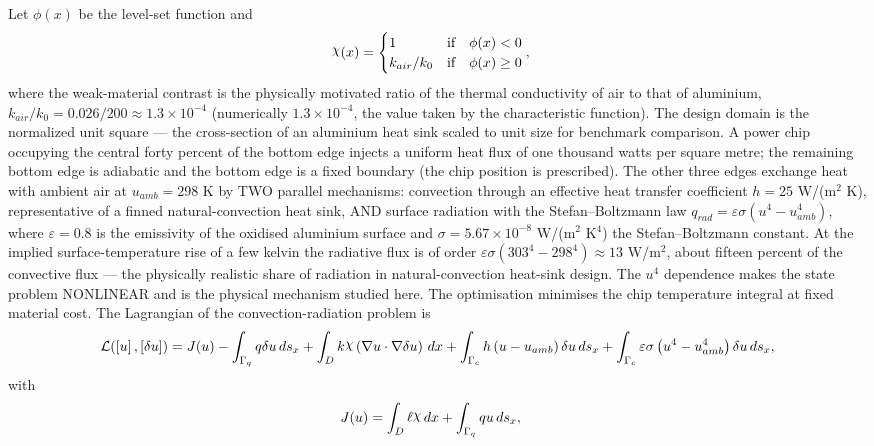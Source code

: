 \documentclass[preview]{standalone}
\let\oldcdot\cdot
\let\cdot\oldcdot
\begin{document}
Let $\phi(x)$ be the level-set function and
 \begin{align*}\raisebox{\depth}{$\chi$}(x) &= \begin{cases} 1 & \mbox{if}\quad \phi(x) < 0 \\ k_{air}/k_0 & \mbox{if}\quad \phi(x)  \ge 0 \end{cases},\end{align*}
where the weak-material contrast is the physically motivated ratio of the thermal conductivity of air to that of aluminium, $k_{air}/k_0 = 0.026/200 \approx 1.3 \times 10^{-4}$ (numerically $1.3 \times 10^{-4}$, the value taken by the characteristic function).
The design domain is the normalized unit square — the cross-section of an aluminium heat sink scaled to unit size for benchmark comparison.  A power chip occupying the central forty percent of the bottom edge injects a uniform heat flux of one thousand watts per square metre; the remaining bottom edge is adiabatic and the bottom edge is a fixed boundary (the chip position is prescribed).  The other three edges exchange heat with ambient air at $u_{amb} = 298$ K by TWO parallel mechanisms: convection through an effective heat transfer coefficient $h = 25$ W/(m$^{2}$ K), representative of a finned natural-convection heat sink, AND surface radiation with the Stefan--Boltzmann law $q_{rad} = \varepsilon \sigma \left( u^{4} - u_{amb}^{4}\right)$, where $\varepsilon = 0.8$ is the emissivity of the oxidised aluminium surface and $\sigma = 5.67 \times 10^{-8}$ W/(m$^{2}$ K$^{4}$) the Stefan--Boltzmann constant.  At the implied surface-temperature rise of a few kelvin the radiative flux is of order $\varepsilon \sigma \left(303^{4} - 298^{4}\right) \approx 13$ W/m$^{2}$, about fifteen percent of the convective flux — the physically realistic share of radiation in natural-convection heat-sink design.  The $u^{4}$ dependence makes the state problem NONLINEAR and is the physical mechanism studied here.  The optimisation minimises the chip temperature integral at fixed material cost.
The Lagrangian of the convection-radiation problem is
\begin{dmath*}
\mathcal L(\left[ u\right],\left[ \delta u\right]) = J(u) -  \int_{\Gamma_q} q  \delta u \,ds_x +  \int_{D} k \raisebox{\depth}{$\chi$} \left(  \nabla u  \cdot  \nabla \delta u  \right) \,dx + \int_{\Gamma_c} h \left( u - u_{amb}\right) \delta u \,ds_x + \int_{\Gamma_c} \varepsilon \sigma \left( u^{4} - u_{amb}^{4}\right) \delta u \,ds_x ,
\end{dmath*}
with
\begin{align*}
J(u) &=  \int_{D} \ell \raisebox{\depth}{$\chi$} \,dx + \int_{\Gamma_q} q u \,ds_x ,
 \end{align*}
\end{document}
